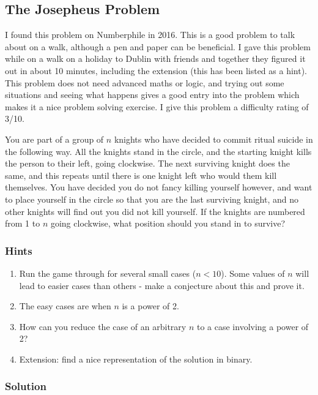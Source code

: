 \subsection{The Josepheus Problem}

I found this problem on Numberphile in 2016. This is a good problem to talk about on a walk, although a pen and paper can be beneficial. I gave this problem while on a walk on a holiday to Dublin with friends and together they figured it out in about 10 minutes, including the extension (this has been listed as a hint). This problem does not need advanced maths or logic, and trying out some situations and seeing what happens gives a good entry into the problem which makes it a nice problem solving exercise. I give this problem a difficulty rating of 3/10.

You are part of a group of $n$ knights who have decided to commit ritual suicide in the following way. All the knights stand in the circle, and the starting knight kills the person to their left, going clockwise. The next surviving knight does the same, and this repeats until there is one knight left who would them kill themselves. You have decided you do not fancy killing yourself however, and want to place yourself in the circle so that you are the last surviving knight, and no other knights will find out you did not kill yourself. If the knights are numbered from 1 to $n$ going clockwise, what position should you stand in to survive?

\subsubsection{Hints}

\begin{enumerate}
	\item Run the game through for several small cases ($n < 10$). Some values of $n$ will lead to easier cases than others - make a conjecture about this and prove it.
	\item The easy cases are when $n$ is a power of 2.
	\item How can you reduce the case of an arbitrary $n$ to a case involving a power of 2?
	\item Extension: find a nice representation of the solution in binary.
\end{enumerate}

\subsubsection{Solution}


